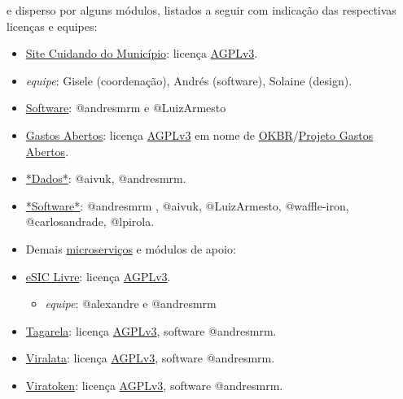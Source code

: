 \documentclass[letterpaper,10pt,brazil]{sphinxmanual}
\begin{document}
e disperso por alguns módulos, listados a seguir com indicação das
respectivas licenças e equipes:
\begin{itemize}
\item {} 
\href{https://github.com/okfn-brasil/cuidando2.git}{Site Cuidando do
Município}: licença \href{https://github.com/okfn-brasil/cuidando2/blob/master/LICENSE.txt}{AGPLv3}.

\item {} 
\emph{equipe}: Gisele (coordenação), Andrés (software), Solaine (design).

\item {} 
\href{https://github.com/okfn-brasil/cuidando2/graphs/contributors}{Software}:
@andresmrm e @LuizArmesto

\item {} 
\href{https://github.com/okfn-brasil/gastos\_abertos}{Gastos Abertos}:
licença \href{https://github.com/okfn-brasil/gastos\_abertos/blob/master/LICENSE}{AGPLv3}
em nome de \href{http://br.okfn.org/}{OKBR}/\href{http://wiki.okfn.org/Open\_Knowledge\_Brasil/Gastos\_Abertos}{Projeto Gastos
Abertos}.

\item {} 
\href{https://github.com/okfn-brasil/gastos\_abertos/commits/master/data}{*Dados*}:
@aivuk, @andresmrm.

\item {} 
\href{https://github.com/okfn-brasil/gastos\_abertos/graphs/contributors}{*Software*}:
@andresmrm , @aivuk, @LuizArmesto, @waffle-iron, @carlosandrade,
@lpirola.

\item {} 
Demais
\href{https://en.wikipedia.org/wiki/Microservices}{microserviços} e
módulos de apoio:

\item {} 
\href{https://github.com/okfn-brasil/esiclivre}{eSIC Livre}: licença \href{https://github.com/okfn-brasil/esiclivre/blob/master/LICENSE.txt}{AGPLv3}.
\begin{itemize}
\item {} 
\emph{equipe}: @alexandre e @andresmrm

\end{itemize}

\item {} 
\href{https://github.com/okfn-brasil/tagarela}{Tagarela}: licença \href{https://github.com/okfn-brasil/tagarela/blob/master/LICENSE.txt}{AGPLv3},
software @andresmrm.

\item {} 
\href{https://github.com/okfn-brasil/viralata}{Viralata}: licença \href{https://github.com/okfn-brasil/viralata/blob/master/LICENSE.txt}{AGPLv3},
software @andresmrm.

\item {} 
\href{https://github.com/okfn-brasil/viratoken}{Viratoken}: licença \href{https://github.com/okfn-brasil/viratoken/blob/master/LICENSE.txt}{AGPLv3},
software @andresmrm.

\end{itemize}
\end{document}
